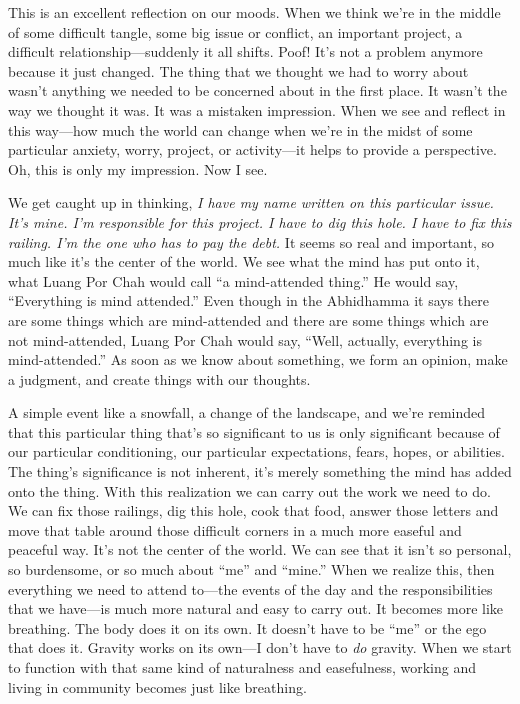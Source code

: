 This is an excellent reflection on our moods. When we think we're in 
the middle of some difficult tangle, some big issue or conflict, an 
important project, a difficult relationship---suddenly it all shifts. 
Poof! It's not a problem anymore because it just changed. The thing 
that we thought we had to worry about wasn't anything we needed to be 
concerned about in the first place. It wasn't the way we thought it 
was. It was a mistaken impression. When we see and reflect in this 
way---how much the world can change when we're in the midst of some 
particular anxiety, worry, project, or activity---it helps to provide a 
perspective. Oh, this is only my impression. Now I see.

We get caught up in thinking, \emph{I have my name written on this 
particular issue. It's mine. I'm responsible for this project. I have 
to dig this hole. I have to fix this railing. I'm the one who has to 
pay the debt.} It seems so real and important, so much like it's the 
center of the world. We see what the mind has put onto it, what Luang 
Por Chah would call ``a mind-attended thing.'' He would say, 
``Everything is mind attended.'' Even though in the Abhidhamma it says 
there are some things which are mind-attended and there are some things 
which are not mind-attended, Luang Por Chah would say, ``Well, 
actually, everything is mind-attended.'' As soon as we know about 
something, we form an opinion, make a judgment, and create things with 
our thoughts.

A simple event like a snowfall, a change of the landscape, and we're 
reminded that this particular thing that's so significant to us is only 
significant because of our particular conditioning, our particular 
expectations, fears, hopes, or abilities. The thing's significance is 
not inherent, it's merely something the mind has added onto the thing. 
With this realization we can carry out the work we need to do. We can 
fix those railings, dig this hole, cook that food, answer those letters 
and move that table around those difficult corners in a much more 
easeful and peaceful way. It's not the center of the world. We can see 
that it isn't so personal, so burdensome, or so much about ``me'' and 
``mine.'' When we realize this, then everything we need to attend 
to---the events of the day and the responsibilities that we have---is 
much more natural and easy to carry out. It becomes more like 
breathing. The body does it on its own. It doesn't have to be ``me'' or 
the ego that does it. Gravity works on its own---I don't have to 
\emph{do} gravity. When we start to function with that same kind of 
naturalness and easefulness, working and living in community becomes 
just like breathing.


